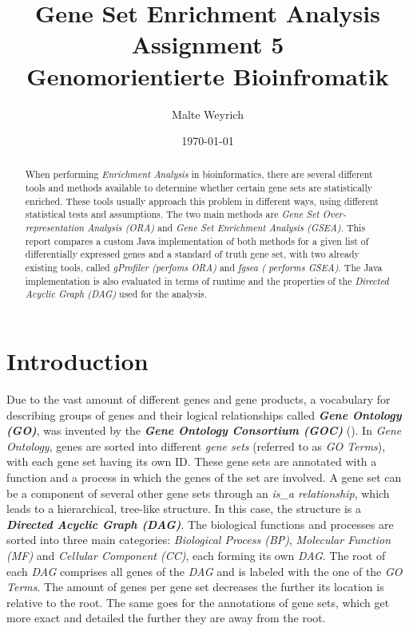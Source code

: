 \documentclass[12pt]{article}
\title{Gene Set Enrichment Analysis \\Assignment 5\\ Genomorientierte Bioinfromatik}
\author{Malte Weyrich}
\date{\today}
\begin{document}
\maketitle

\begin{abstract}
When performing \textit{Enrichment Analysis} in bioinformatics, there are several different tools and methods available to determine whether certain gene sets are statistically enriched. 
These tools usually approach this problem in different ways, using different statistical tests and assumptions.
The two main methods are \textit{Gene Set Over-representation Analysis (ORA)} and \textit{Gene Set Enrichment Analysis (GSEA)}.
This report compares a custom Java implementation of both methods for a given list of differentially expressed genes and a standard of truth gene set,
with two already existing tools, called \textit{gProfiler (perfoms ORA)} and \textit{fgsea ( performs GSEA)}.
The Java implementation is also evaluated in terms of runtime and the properties of the \textit{Directed Acyclic Graph (DAG)} used for the analysis.


\end{abstract}

\newpage

\tableofcontents

\newpage



\section{Introduction}\label{sec:Introduction}
Due to the vast amount of different genes and gene products, a vocabulary for describing
groups of genes and their logical relationships called \textit{\textbf{Gene Ontology
(GO)}}, was invented by the \textit{\textbf{Gene Ontology Consortium (GOC)}} (\cite{Ashburner2000}).
In \textit{Gene Ontology}, genes are sorted into different \textit{gene sets} (referred
to as \textit{GO Terms}), with each gene set having its own ID.
These gene sets are annotated with a function and a process
in which the genes of the set are involved. A gene set can be a component of several
other gene sets through an \textit{is\_a relationship}, which leads to a hierarchical,
tree-like structure. In this case, the structure is a \textit{\textbf{Directed Acyclic
Graph (DAG)}}. The biological functions and processes are sorted into three main categories:
\textit{Biological Process (BP)}, \textit{Molecular Function (MF)} and \textit{Cellular
Component (CC)}, each forming its own \textit{DAG}. The root of each \textit{DAG}
comprises all genes of the \textit{DAG} and is labeled with the one of the \textit{GO
Terms}. The amount of genes per gene set decreases the further its location is
relative to the root. The same goes for the annotations of gene sets, which get more exact
and detailed the further they are away from the root. 
\end{document}
